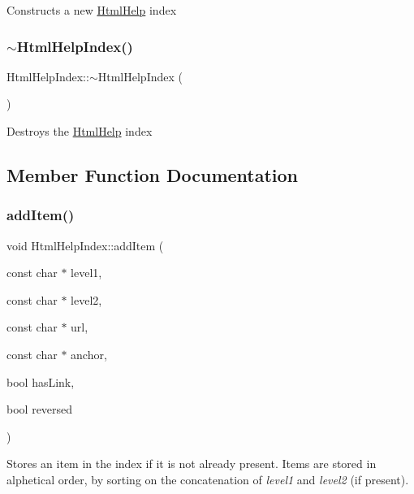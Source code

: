 Constructs a new \mbox{\hyperlink{class_html_help}{Html\+Help}} index \mbox{\label{class_html_help_index_a0b68b2ca104803c3a6dc76a18aa05f13}} 
\subsubsection{\texorpdfstring{$\sim$HtmlHelpIndex()}{~HtmlHelpIndex()}}
{\footnotesize\ttfamily Html\+Help\+Index\+::$\sim$\+Html\+Help\+Index (\begin{DoxyParamCaption}{ }\end{DoxyParamCaption})}

Destroys the \mbox{\hyperlink{class_html_help}{Html\+Help}} index 

\subsection{Member Function Documentation}
\mbox{\label{class_html_help_index_aa6f679550c81eee3249f29395ad7e174}} 
\subsubsection{\texorpdfstring{addItem()}{addItem()}}
{\footnotesize\ttfamily void Html\+Help\+Index\+::add\+Item (\begin{DoxyParamCaption}\item[{const char $\ast$}]{level1,  }\item[{const char $\ast$}]{level2,  }\item[{const char $\ast$}]{url,  }\item[{const char $\ast$}]{anchor,  }\item[{bool}]{has\+Link,  }\item[{bool}]{reversed }\end{DoxyParamCaption})}

Stores an item in the index if it is not already present. Items are stored in alphetical order, by sorting on the concatenation of {\itshape level1} and {\itshape level2} (if present).


